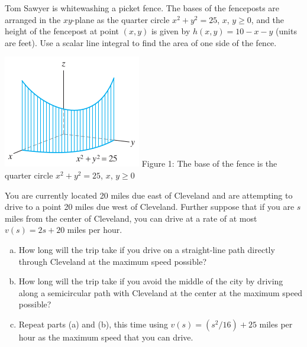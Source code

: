 \documentclass[11pt,letterpaper,boxed]{pset}
\begin{document}
    
    \begin{problem} [6.1.34]
    	Tom Sawyer is whitewashing a picket fence. The bases of the fenceposts are arranged in the $xy$-plane as the quarter circle $x^2 + y^2 = 25$, $x$, $y \geq 0$, and the height of the fencepost at point $(x, y)$ is given by $h(x, y) = 10 - x - y$ (units are feet). Use a scalar line integral to find the area of one side of the fence.
    
    \end{problem}
    
    \begin{minipage}[t]{0.5\textwidth}
    	\includegraphics[width=\textwidth]{fence.png}
    	Figure 1: The base of the fence is the quarter circle 
    		$x^2 + y^2 = 25$, $x$, $y \geq 0$
    \end{minipage}
    \newpage
    
    
    \begin{problem} [6.1.40]
        You are currently located 20 miles due east of Cleveland and are attempting to drive to a point 20 miles due west of Cleveland. Further suppose that if you are $s$ miles from the center of Cleveland, you can drive at a rate of at most $v(s) = 2s + 20$ miles per hour.
        \bigskip
    	
    	\begin{enumerate} [(a)]
    	    \item How long will the trip take if you drive on a straight-line path directly through Cleveland at the maximum speed possible?
    	    \item How long will the trip take if you avoid the middle of the city by driving along a semicircular path with Cleveland at the center at the maximum speed possible?
    	    \item Repeat parts (a) and (b), this time using $v(s) = (s^2 /16) + 25$ miles per hour as the maximum speed that you can drive.
    	\end{enumerate}
    
    \end{problem}
    \newpage
    
\end{document}
